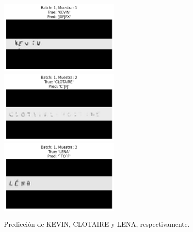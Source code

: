 \documentclass[10pt]{article}
\begin{document}
	\begin{figure}[!h]
		\centering
		\includegraphics[width=60mm]{./images/prediction1.jpg}
		\includegraphics[width=60mm]{./images/prediction2.jpg}
		\includegraphics[width=60mm]{./images/prediction3.jpg}
		\caption{Predicción de KEVIN, CLOTAIRE y LENA, respectivamente.}
		\label{fig:pred}
	\end{figure}
	
\end{document}
